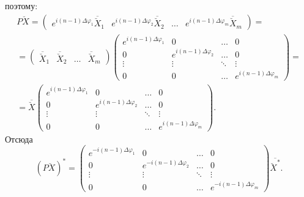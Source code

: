 поэтому:
\begin{multline*}
    P \breve{X}
    = \begin{pmatrix}
        e^{i (n-1) \Delta \varphi_1} \overline{\breve{X}}_1 & e^{i (n-1) \Delta \varphi_2} \overline{\breve{X}}_2 & \dots & e^{i (n-1) \Delta \varphi_m} \overline{\breve{X}}_m
    \end{pmatrix} = \\
    = \begin{pmatrix}
        \overline{\breve{X}}_1 & \overline{\breve{X}}_2 & \dots & \overline{\breve{X}}_m
    \end{pmatrix}
    \begin{pmatrix}
        e^{i (n-1) \Delta \varphi_1} & 0                            & \dots  & 0                            \\
        0                            & e^{i (n-1) \Delta \varphi_2} & \dots  & 0                            \\
        \vdots                       & \vdots                       & \ddots & \vdots                       \\
        0                            & 0                            & \dots  & e^{i (n-1) \Delta \varphi_m}
    \end{pmatrix} = \\
    = \overline{\breve{X}}
    \begin{pmatrix}
        e^{i (n-1) \Delta \varphi_1} & 0                            & \dots  & 0                            \\
        0                            & e^{i (n-1) \Delta \varphi_2} & \dots  & 0                            \\
        \vdots                       & \vdots                       & \ddots & \vdots                       \\
        0                            & 0                            & \dots  & e^{i (n-1) \Delta \varphi_m}
    \end{pmatrix} .
\end{multline*}
Отсюда
\[
    \left( P \breve{X} \right)^*
    =
    \begin{pmatrix}
        e^{- i (n-1) \Delta \varphi_1} & 0                            & \dots  & 0                            \\
        0                            & e^{- i (n-1) \Delta \varphi_2} & \dots  & 0                            \\
        \vdots                       & \vdots                       & \ddots & \vdots                       \\
        0                            & 0                            & \dots  & e^{- i (n-1) \Delta \varphi_m}
    \end{pmatrix}
    \overline{\breve{X}^*} .
\]

